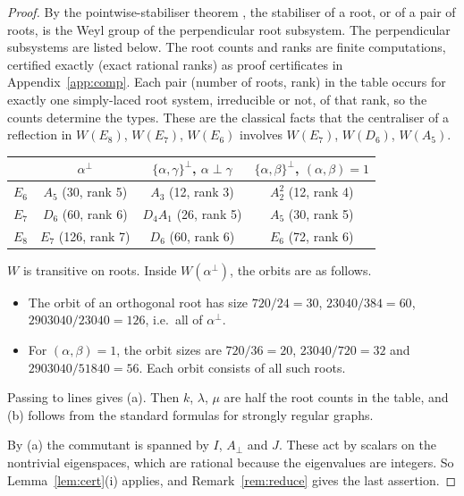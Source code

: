 \documentclass[11pt]{amsart}
\theoremstyle{definition}
\begin{document}
\begin{proof}
By the pointwise-stabiliser theorem \cite[Thm.~1.12(c),(d), pp.~22--23]{Hum90}, the stabiliser of a root, or of a pair of roots, is the Weyl group of the
perpendicular root subsystem. The perpendicular subsystems are listed below. The root counts and ranks are
finite computations, certified exactly (exact rational ranks) as proof certificates in Appendix~\ref{app:comp}. Each pair (number of roots, rank) in the table occurs for exactly one
simply-laced root system, irreducible or not, of that rank, so the counts determine the types. These are the
classical facts that the centraliser of a reflection in $W(E_8)$, $W(E_7)$, $W(E_6)$ involves $W(E_7)$, $W(D_6)$,
$W(A_5)$.

\begin{center}\small
\begin{tabular}{lccc}
\toprule
 & $\alpha^\perp$ & $\{\alpha,\gamma\}^\perp$, $\alpha\perp\gamma$ & $\{\alpha,\beta\}^\perp$, $(\alpha,\beta)=1$\\
\midrule
$E_6$ & $A_5$ (30, rank 5) & $A_3$ (12, rank 3) & $A_2^2$ (12, rank 4)\\
$E_7$ & $D_6$ (60, rank 6) & $D_4A_1$ (26, rank 5) & $A_5$ (30, rank 5)\\
$E_8$ & $E_7$ (126, rank 7) & $D_6$ (60, rank 6) & $E_6$ (72, rank 6)\\
\bottomrule
\end{tabular}
\end{center}

$W$ is transitive on roots. Inside $W(\alpha^\perp)$, the orbits are as follows.
\begin{itemize}
\item The orbit of an orthogonal root has size $720/24=30$, $23040/384=60$, $2903040/23040=126$, i.e.\ all of
$\alpha^\perp$.
\item For $(\alpha,\beta)=1$, the orbit sizes are $720/36=20$, $23040/720=32$ and
$2903040/51840=56$. Each orbit consists of all such roots.
\end{itemize}
Passing to lines gives (a). Then $k$, $\lambda$, $\mu$ are half the root counts in the table, and (b) follows from
the standard formulas for strongly regular graphs.

By (a) the commutant is spanned by $I$, $A_\perp$ and $J$. These act by scalars on the nontrivial eigenspaces,
which are rational because the eigenvalues are integers. So Lemma~\ref{lem:cert}(i) applies, and
Remark~\ref{rem:reduce} gives the last assertion.
\end{proof}
\end{document}
